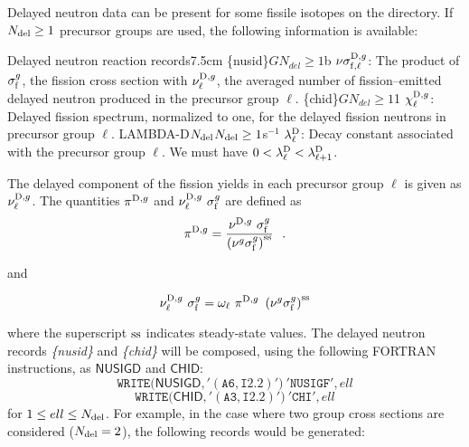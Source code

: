 Delayed neutron data can be present for some fissile isotopes on the  directory. If $N_{\rm
del}\ge 1$ precursor groups are used, the following information is available:

\begin{DescriptionEnregistrement}{Delayed neutron reaction
records}{7.5cm}
\label{tabl:tabiso2}
\OptRealVar
  {\{nusid\}}{$G$}{$N_{del}\ge 1$}{b}
  {$\nu\sigma_{{\rm f},\ell}^{{\rm D},g}$: The product of $\sigma_{\rm f}^{g}$, the fission cross section with
   $\nu_{\ell}^{{\rm D},g}$, the averaged number of fission--emitted delayed
   neutron produced in the precursor group $\ell$.}
\OptRealVar
  {\{chid\}}{$G$}{$N_{del}\ge 1$}{1}
  {$\chi^{{\rm D},g}_\ell$: Delayed fission spectrum, normalized to one, for the delayed fission
   neutrons in precursor group $\ell$.}
\OptRealEnr
  {LAMBDA-D}{$N_{\rm del}$}{$N_{\rm del}\ge 1$}{s$^{-1}$}
  {$\lambda^{\rm D}_\ell$: Decay constant associated with the precursor group $\ell$. We must have
   $0 <\lambda^{\rm D}_\ell<\lambda^{\rm D}_{\ell+1}$.}
\end{DescriptionEnregistrement}

The delayed component of the fission yields in each precursor group $\ell$ is given as
$\nu_\ell^{{\rm D},g}$. The quantities $\pi^{{\rm D},g}$ and $\nu_\ell^{{\rm D},g} \ \sigma_{\rm f}^g$ are defined as
$$\pi^{{\rm D},g}={\nu^{{\rm D},g} \ \sigma_{\rm f}^g \over
   \left( \nu^g \sigma_{\rm f}^g \right)^{\rm ss}} \ \ .$$

\noindent and

$$\nu_\ell^{{\rm D},g} \ \sigma_{\rm f}^g=\omega_\ell \ \pi^{{\rm D},g} \
   \left( \nu^g \sigma_{\rm f}^g \right)^{\rm ss}$$

\noindent where the superscript ${\rm ss}$ indicates steady-state values. The
delayed neutron records {\sl \{nusid\}} and {\sl \{chid\}} will be
composed, using the following FORTRAN instructions, as $\mathsf{NUSIGD}$ and $\mathsf{CHID}$:
  \begin{displaymath}
    \mathtt{WRITE(}\mathsf{NUSIGD}\mathtt{,'(A6,I2.2)')} \ \mathtt{'NUSIGF'},ell
  \end{displaymath}
  \begin{displaymath}
    \mathtt{WRITE(}\mathsf{CHID}\mathtt{,'(A3,I2.2)')} \ \mathtt{'CHI'},ell
  \end{displaymath}
for $1\leq ell \leq N_{\rm del}$. For example, in the case where two group cross sections are considered
($N_{\rm del}=2$), the following records would be generated:

